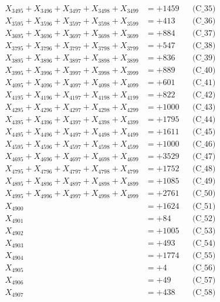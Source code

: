 \documentclass[a4paper,10pt]{article}
\begin{document}
{\begin{align}
X_{3495} + X_{3496} + X_{3497} + X_{3498} + X_{3499} &= +1459 && \text{(C\_35)} \\
\allowbreak
X_{3595} + X_{3596} + X_{3597} + X_{3598} + X_{3599} &= +413 && \text{(C\_36)} \\
X_{3695} + X_{3696} + X_{3697} + X_{3698} + X_{3699} &= +884 && \text{(C\_37)} \\
X_{3795} + X_{3796} + X_{3797} + X_{3798} + X_{3799} &= +547 && \text{(C\_38)} \\
X_{3895} + X_{3896} + X_{3897} + X_{3898} + X_{3899} &= +836 && \text{(C\_39)} \\
X_{3995} + X_{3996} + X_{3997} + X_{3998} + X_{3999} &= +889 && \text{(C\_40)} \\
\allowbreak
X_{4095} + X_{4096} + X_{4097} + X_{4098} + X_{4099} &= +601 && \text{(C\_41)} \\
X_{4195} + X_{4196} + X_{4197} + X_{4198} + X_{4199} &= +822 && \text{(C\_42)} \\
X_{4295} + X_{4296} + X_{4297} + X_{4298} + X_{4299} &= +1000 && \text{(C\_43)} \\
X_{4395} + X_{4396} + X_{4397} + X_{4398} + X_{4399} &= +1795 && \text{(C\_44)} \\
X_{4495} + X_{4496} + X_{4497} + X_{4498} + X_{4499} &= +1611 && \text{(C\_45)} \\
\allowbreak
X_{4595} + X_{4596} + X_{4597} + X_{4598} + X_{4599} &= +1000 && \text{(C\_46)} \\
X_{4695} + X_{4696} + X_{4697} + X_{4698} + X_{4699} &= +3529 && \text{(C\_47)} \\
X_{4795} + X_{4796} + X_{4797} + X_{4798} + X_{4799} &= +1752 && \text{(C\_48)} \\
X_{4895} + X_{4896} + X_{4897} + X_{4898} + X_{4899} &= +1085 && \text{(C\_49)} \\
X_{4995} + X_{4996} + X_{4997} + X_{4998} + X_{4999} &= +2761 && \text{(C\_50)} \\
\allowbreak
X_{4900} &= +1624 && \text{(C\_51)} \\
X_{4901} &= +84 && \text{(C\_52)} \\
X_{4902} &= +1005 && \text{(C\_53)} \\
X_{4903} &= +493 && \text{(C\_54)} \\
X_{4904} &= +1774 && \text{(C\_55)} \\
\allowbreak
X_{4905} &= +4 && \text{(C\_56)} \\
X_{4906} &= +49 && \text{(C\_57)} \\
X_{4907} &= +438 && \text{(C\_58)} \\

\end{align}}
\end{document}
